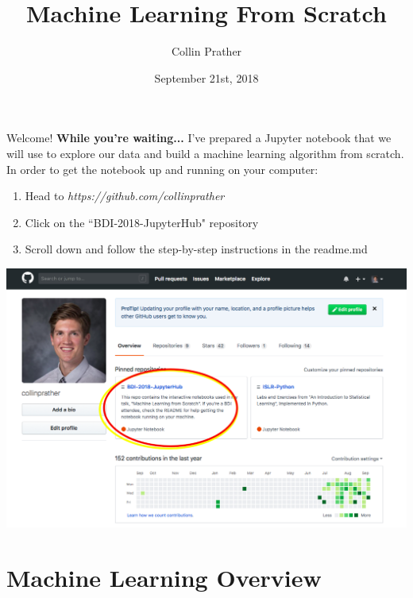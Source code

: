 \documentclass[notes]{beamer}
\title{Machine Learning From Scratch}
\author{Collin Prather}
\date{September 21st, 2018}
\begin{document}
\begin{frame}{Welcome!}
\textbf{While you're waiting...}
I've prepared a Jupyter notebook that we will use to explore our data and build a machine learning algorithm from scratch. In order to get the notebook up and running on your computer:\\
\begin{multicols}{2}
	\begin{enumerate}
		\item[1.)] Head to \textit{https://github.com/collinprather}
		\item[2.)] Click on the ``BDI-2018-JupyterHub" repository
		\item[3.)] Scroll down and follow the step-by-step instructions in the readme.md
	\end{enumerate}
	\columnbreak
	\begin{flushright}
		\includegraphics[scale=.122]{Figures/github_profile}
	\end{flushright}
\end{multicols}
\end{frame}

\section{Machine Learning Overview}
\frame{\titlepage}
\end{document}
